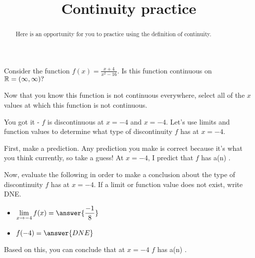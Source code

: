 \documentclass[handout]{ximera}
\title{Continuity practice}
\begin{document}
\begin{abstract}
Here is an opportunity for you to practice using the definition of continuity. 
\end{abstract}
\maketitle

\begin{exercise}

Consider the function $f(x) = \frac{x+4}{x^2-16}.$  Is this function continuous on $\mathbb R = (\infty, \infty)?$  

\begin{multipleChoice}
\end{multipleChoice}

\begin{exercise}
Now that you know this function is not continuous everywhere, select all of the $x$ values at which this function is not continuous. 

\begin{selectAll}
\end{selectAll}

\begin{exercise}

You got it - $f$ is discontinuous at $x=-4$ and $x=-4$.  Let's use limits and function values to determine what type of discontinuity $f$ has at $x=-4$.

First, make a prediction.  Any prediction you make is correct because it's what you think currently, so take a guess!  At $x=-4$, I predict that $f$ has a(n) .  

Now, evaluate the following in order to make a conclusion about the type of discontinuity $f$ has at $x=-4$.  If a limit or function value does not exist, write DNE.

\begin{itemize}

\item $\displaystyle\lim_{x \to -4} f(x) = \answer{\frac{-1}{8}}$

\item $f(-4) = \answer{DNE}$

\end{itemize}

Based on this, you can conclude that at $x=-4$ $f$ has a(n) .  

\end{exercise}
\end{exercise}
\end{exercise}
\end{document}
